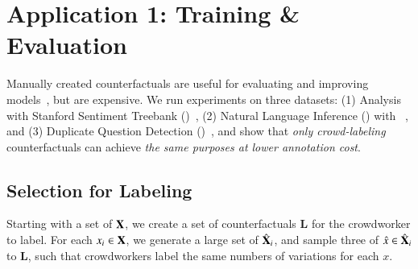 \section{Application 1: Training \& Evaluation}
\label{sec:app_label}
Manually created counterfactuals are useful for evaluating and improving models~\cite{gardner2020contrast,kaushik2019learning}, but are expensive.
We run experiments on three datasets: (1) \sst Analysis with Stanford Sentiment Treebank (\dsst)~\cite{socher2013recursive},
(2) Natural Language Inference (\nli) with \dnli~\cite{bowman-etal-2015-large}, and 
(3) Duplicate Question Detection (\dqqp)~\cite{wang2018glue}, 
and show that \emph{only crowd-labeling} \sysname counterfactuals can achieve \emph{the same purposes at lower annotation cost}.





\subsection{Selection for Labeling}
\label{subsec:gen_counterfactual_for_labeling}


Starting with a set of $\mathbf{X}$, we create a set of counterfactuals $\mathbf{L}$ for the crowdworker to label.
For each $x_i \in \mathbf{X}$, we generate a large set of $\hat{\mathbf{X}}_i$, and sample three of $\hat{x} \in \hat{\mathbf{X}}_i$ to $\mathbf{L}$, such that crowdworkers label the same numbers of variations for each $x$.

